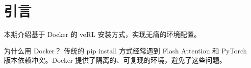 \section{引言}
本期介绍基于 Docker 的 veRL 安装方式，实现无痛的环境配置。

\begin{knowledgebox}{为什么用 Docker？}
传统的 pip install 方式经常遇到 Flash Attention 和 PyTorch 版本依赖冲突。Docker 提供了隔离的、可复现的环境，避免了这些问题。
\end{knowledgebox}

